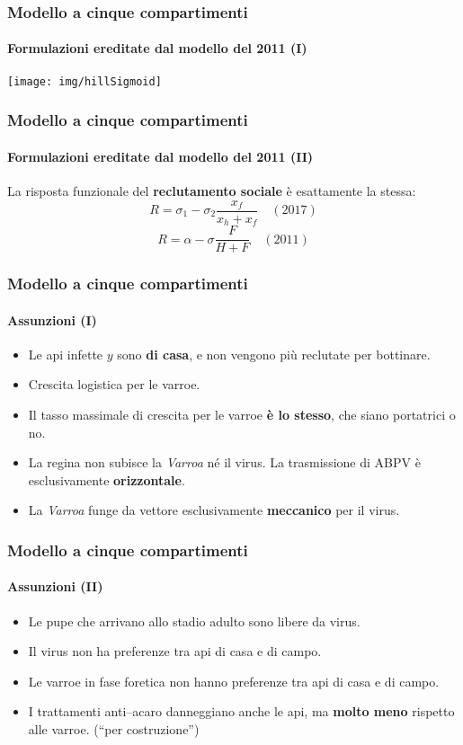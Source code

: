 \documentclass[]{beamer}
\begin{document}
\begin{frame}
    \frametitle{Modello a cinque compartimenti}
    \framesubtitle{Formulazioni ereditate dal modello del 2011 (I)}

    \begin{center}
            \texttt{[image: img/hillSigmoid]}
    \end{center}
\end{frame}

\begin{frame}
    \frametitle{Modello a cinque compartimenti}
    \framesubtitle{Formulazioni ereditate dal modello del 2011 (II)}

    La risposta funzionale del \textbf{reclutamento sociale} è esattamente la stessa:
    $$R = \sigma_1 - \sigma_2 \frac{x_f}{x_h+x_f} \quad (2017)$$
    \pause
    $$R = \alpha - \sigma \frac{F}{H+F} \quad (2011)$$
\end{frame}

\begin{frame}
    \frametitle{Modello a cinque compartimenti}
    \framesubtitle{Assunzioni (I)}

    \begin{itemize}
        \item \pause Le api infette $y$ sono \textbf{di casa}, \pause
            e non vengono più reclutate per bottinare.
        \item \pause Crescita logistica per le varroe.
        \item \pause Il tasso massimale di crescita per le varroe \textbf{è lo stesso},
            che siano portatrici o no.
        \item \pause La regina non subisce la \emph{Varroa} né il virus.
            \pause La trasmissione di ABPV è esclusivamente \textbf{orizzontale}.
        \item \pause La \emph{Varroa} funge da vettore esclusivamente \textbf{meccanico} per il virus.
    \end{itemize}
\end{frame}

\begin{frame}
    \frametitle{Modello a cinque compartimenti}
    \framesubtitle{Assunzioni (II)}

    \begin{itemize}
        \item Le pupe che arrivano allo stadio adulto sono libere da virus.
        \item \pause Il virus non ha preferenze tra api di casa e di campo.
        \item \pause Le varroe in fase foretica non hanno preferenze tra api di casa e di campo.
        \item \pause I trattamenti anti--acaro danneggiano anche le api,
            ma \textbf{molto meno} rispetto alle varroe. \pause (``per costruzione'')
    \end{itemize}
\end{frame}
\end{document}
